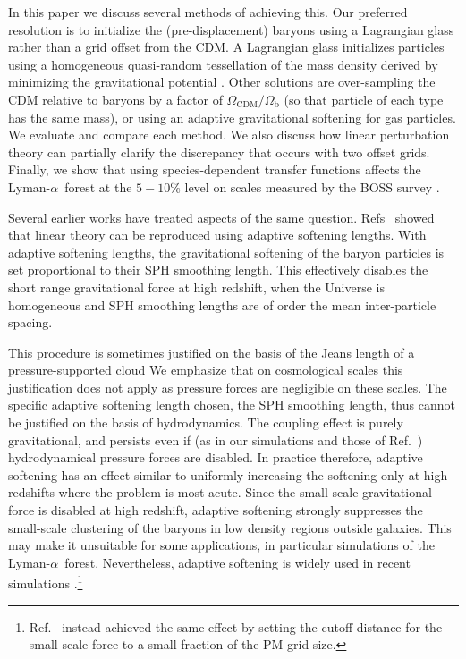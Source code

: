 \documentclass[a4paper,11pt]{article}
\newcommand{\Lya}{Lyman-$\alpha$}
\begin{document}
In this paper we discuss several methods of achieving this. Our preferred resolution is to initialize the (pre-displacement) baryons using a Lagrangian glass rather than a grid offset from the CDM. A Lagrangian glass initializes particles using a homogeneous quasi-random tessellation of the mass density derived by minimizing the gravitational potential \cite{White:1994}. Other solutions are over-sampling the CDM relative to baryons by a factor of $\Omega_\mathrm{CDM}/\Omega_\mathrm{b}$ (so that particle of each type has the same mass), or using an adaptive gravitational softening for gas particles. We evaluate and compare each method. We also discuss how linear perturbation theory can partially clarify the discrepancy that occurs with two offset grids. Finally, we show that using species-dependent transfer functions affects the \Lya~forest at the $5-10\%$ level on scales measured by the BOSS survey \cite{PD2013}.



Several earlier works have treated aspects of the same question. Refs~\cite{OLeary:2012, Angulo:2013} showed that linear theory can be reproduced using adaptive softening lengths. With adaptive softening lengths, the gravitational softening of the baryon particles is set proportional to their SPH smoothing length. This effectively disables the short range gravitational force at high redshift, when the Universe is homogeneous and SPH smoothing lengths are of order the mean inter-particle spacing.

This procedure is sometimes justified on the basis of the Jeans length of a pressure-supported cloud \cite{Fire2:2018} We emphasize that on cosmological scales this justification does not apply as pressure forces are negligible on these scales. The specific adaptive softening length chosen, the SPH smoothing length, thus cannot be justified on the basis of hydrodynamics. The coupling effect is purely gravitational, and persists even if (as in our simulations and those of Ref.~\cite{Angulo:2013}) hydrodynamical pressure forces are disabled. In practice therefore, adaptive softening has an effect similar to uniformly increasing the softening only at high redshifts where the problem is most acute. Since the small-scale gravitational force is disabled at high redshift, adaptive softening strongly suppresses the small-scale clustering of the baryons in low density regions outside galaxies. This may make it unsuitable for some applications, in particular simulations of the \Lya~forest. Nevertheless, adaptive softening is widely used in recent simulations \cite[e.g][]{Paco:2018}.\footnote{Ref.~\cite{Valkenburg:2017} instead achieved the same effect by setting the cutoff distance for the small-scale force to a small fraction of the PM grid size.}
\end{document}
